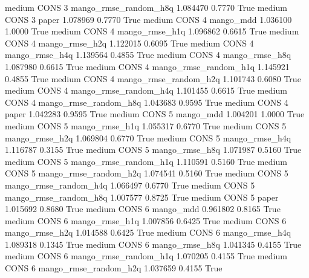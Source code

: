     medium     CONS                 3 mango_rmse_random_h8q   1.084470      0.7770    True
    medium     CONS                 3                 paper   1.078969      0.7770    True
    medium     CONS                 4             mango_mdd   1.036100      1.0000    True
    medium     CONS                 4        mango_rmse_h1q   1.096862      0.6615    True
    medium     CONS                 4        mango_rmse_h2q   1.122015      0.6095    True
    medium     CONS                 4        mango_rmse_h4q   1.139564      0.4855    True
    medium     CONS                 4        mango_rmse_h8q   1.087980      0.6615    True
    medium     CONS                 4 mango_rmse_random_h1q   1.145921      0.4855    True
    medium     CONS                 4 mango_rmse_random_h2q   1.101743      0.6080    True
    medium     CONS                 4 mango_rmse_random_h4q   1.101455      0.6615    True
    medium     CONS                 4 mango_rmse_random_h8q   1.043683      0.9595    True
    medium     CONS                 4                 paper   1.042283      0.9595    True
    medium     CONS                 5             mango_mdd   1.004201      1.0000    True
    medium     CONS                 5        mango_rmse_h1q   1.055317      0.6770    True
    medium     CONS                 5        mango_rmse_h2q   1.069804      0.6770    True
    medium     CONS                 5        mango_rmse_h4q   1.116787      0.3155    True
    medium     CONS                 5        mango_rmse_h8q   1.071987      0.5160    True
    medium     CONS                 5 mango_rmse_random_h1q   1.110591      0.5160    True
    medium     CONS                 5 mango_rmse_random_h2q   1.074541      0.5160    True
    medium     CONS                 5 mango_rmse_random_h4q   1.066497      0.6770    True
    medium     CONS                 5 mango_rmse_random_h8q   1.007577      0.8725    True
    medium     CONS                 5                 paper   1.015692      0.8680    True
    medium     CONS                 6             mango_mdd   0.961802      0.8165    True
    medium     CONS                 6        mango_rmse_h1q   1.007856      0.6425    True
    medium     CONS                 6        mango_rmse_h2q   1.014588      0.6425    True
    medium     CONS                 6        mango_rmse_h4q   1.089318      0.1345    True
    medium     CONS                 6        mango_rmse_h8q   1.041345      0.4155    True
    medium     CONS                 6 mango_rmse_random_h1q   1.070205      0.4155    True
    medium     CONS                 6 mango_rmse_random_h2q   1.037659      0.4155    True
